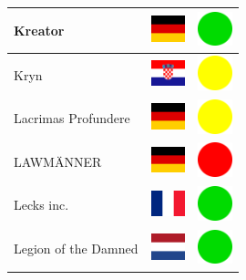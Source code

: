 \documentclass[12pt, a4paper, twoside]{report}
\begin{document}
\begin{center}
\begin{longtable}{|p{5cm}|p{2cm}|p{2cm}|}
			Kreator & \includegraphics[width=1cm]{4x3/de} & \includegraphics[width=1cm]{likes/y} \\ \hline
			Kryn & \includegraphics[width=1cm]{4x3/hr} & \includegraphics[width=1cm]{likes/m} \\ \hline
			Lacrimas Profundere & \includegraphics[width=1cm]{4x3/de} & \includegraphics[width=1cm]{likes/m} \\ \hline
			LAWMÄNNER & \includegraphics[width=1cm]{4x3/de} & \includegraphics[width=1cm]{likes/n} \\ \hline
			Lecks inc. & \includegraphics[width=1cm]{4x3/fr} & \includegraphics[width=1cm]{likes/y} \\ \hline
			Legion of the Damned & \includegraphics[width=1cm]{4x3/nl} & \includegraphics[width=1cm]{likes/y} \\ \hline

\end{longtable}
\end{center}
\end{document}
